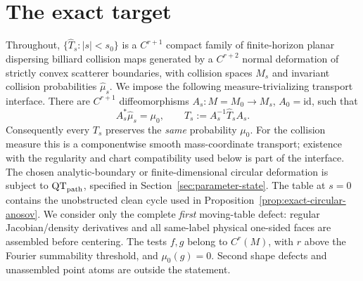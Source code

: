 \documentclass[11pt]{article}
\begin{document}
\section{The exact target}

Throughout, $\{\widehat T_s:|s|<s_0\}$ is a $C^{r+1}$ compact family of
finite-horizon planar dispersing billiard collision maps generated by a
$C^{r+2}$ normal deformation of strictly convex scatterer boundaries, with
collision spaces $M_s$ and invariant collision probabilities
$\widehat\mu_s$.  We impose the following measure-trivializing transport
interface.  There are $C^{r+1}$ diffeomorphisms
$A_s:M=M_0\to M_s$, $A_0=\mathrm{id}$, such that
\begin{equation}
\label{eq:measure-trivializing-gauge}
 A_s^*\widehat\mu_s=\mu_0,\qquad
 T_s:=A_s^{-1}\widehat T_sA_s .
\end{equation}
Consequently every $T_s$ preserves the \emph{same} probability $\mu_0$.
For the collision measure this is a componentwise smooth
mass-coordinate transport; existence with the regularity and chart
compatibility used below is part of the interface.  The chosen
analytic-boundary or
finite-dimensional circular deformation is subject to
$\mathrm{QT}_{\rm path}$, specified in
Section~\ref{sec:parameter-state}.  The table at $s=0$ contains the
unobstructed clean cycle used in
Proposition~\ref{prop:exact-circular-anosov}.  We consider only the complete
\emph{first} moving-table defect: regular Jacobian/density derivatives and all
same-label physical one-sided faces are assembled before centering.  The tests
$f,g$ belong to $C^r(M)$, with $r$ above the Fourier summability threshold,
and $\mu_0(g)=0$.  Second shape defects and unassembled point atoms are outside
the statement.
\end{document}
